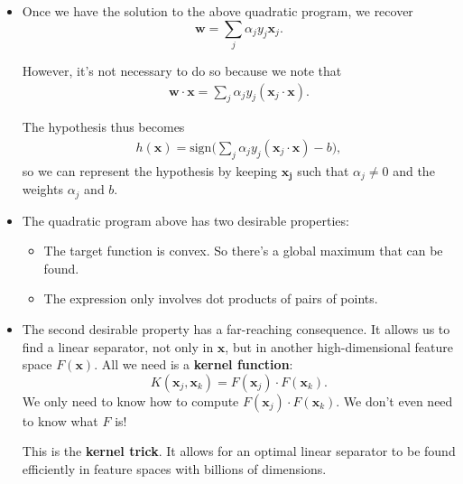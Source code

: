 \documentclass[10pt]{article}
\newcommand{\ve}[1]{\mathbf{#1}}
\begin{document}
\begin{itemize}
    \item Once we have the solution to the above quadratic program,
        we recover $$\ve{w} = \sum_j \alpha_j y_j \ve{x}_j.$$ 
        
        However, it's not necessary to do so because we note that
        \begin{align*}
            \ve{w} \cdot \ve{x} = \sum_{j} \alpha_j y_j (\ve{x}_j
            \cdot \ve{x}).
        \end{align*}
        
        The hypothesis thus becomes
        \begin{align*}
            h(\ve{x}) = \mathrm{sign}\bigg( \sum_{j} 
                \alpha_j y_j (\ve{x}_j
            \cdot \ve{x}) - b \bigg),
        \end{align*}
        so we can represent the hypothesis by keeping $\ve{x_j}$
        such that $\alpha_j \neq 0$ and the weights $\alpha_j$
        and $b$.
        
    \item The quadratic program above has two desirable properties:
        \begin{itemize}
            \item The target function is convex. So there's
                a global maximum that can be found.
            \item The expression only involves dot products
                of pairs of points.
        \end{itemize}
        
    \item The second desirable property has a far-reaching
        consequence. It allows us to find a linear separator,
        not only in $\ve{x}$, but in another high-dimensional 
        feature space $F(\ve{x})$. All we need is a 
        {\bf kernel function}:     
        $$K(\ve{x}_j, \ve{x}_k) = F(\ve{x}_j) \cdot
         F(\ve{x}_k).$$
        We only need to know how to compute 
        $F(\ve{x}_j) \cdot F(\ve{x}_k)$. We don't even need
        to know what $F$ is!
        
        This is the {\bf kernel trick}. It allows for an
        optimal linear separator to be found efficiently
        in feature spaces with billions of dimensions.
\end{itemize}
\end{document}
